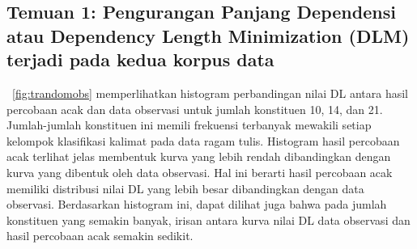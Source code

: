 \subsection{Temuan 1: Pengurangan Panjang Dependensi atau Dependency Length Minimization (DLM) terjadi pada kedua korpus data}
\pic~\ref{fig:trandomobs} memperlihatkan histogram perbandingan nilai DL antara hasil percobaan acak dan data observasi untuk jumlah konstituen 10, 14, dan 21. Jumlah-jumlah konstituen ini memili frekuensi terbanyak mewakili setiap kelompok klasifikasi kalimat pada data ragam tulis.  Histogram hasil percobaan acak terlihat jelas membentuk kurva yang lebih rendah dibandingkan dengan kurva yang dibentuk oleh data observasi. Hal ini berarti hasil percobaan acak memiliki distribusi nilai DL yang lebih besar dibandingkan dengan data observasi. Berdasarkan histogram ini, dapat dilihat juga bahwa pada jumlah konstituen yang semakin banyak, irisan antara kurva nilai DL data observasi dan hasil percobaan acak semakin sedikit.

